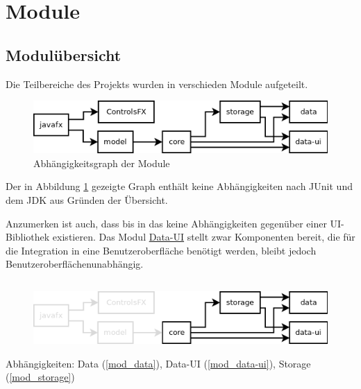 
\newcommand{\depBox}[1]{
	\begin{adjustbox}{minipage=0.85\textwidth,margin=0 \smallskipamount,center}
		Abhängigkeiten:	 \quad #1
	\end{adjustbox} ~\\
}

\section{Module}
\subsection{Modulübersicht}
Die Teilbereiche des Projekts wurden in verschieden Module aufgeteilt.

\begin{figure}[hb!]
	\centering
	\includegraphics[width=.8\textwidth]{module_dependencies.png}
	\caption{Abhängigkeitsgraph der Module}
	\label{mod_dep_view}
\end{figure}

Der in Abbildung \ref{mod_dep_view} gezeigte Graph enthält keine Abhängigkeiten nach JUnit und
dem JDK aus Gründen der Übersicht.

Anzumerken ist auch, dass bis in das  keine Abhängigkeiten
gegenüber einer UI-Bibliothek existieren. Das Modul \hyperref[mod_data-ui]{Data-UI} stellt
zwar Komponenten bereit, die für die Integration in eine Benutzeroberfläche benötigt werden,
bleibt jedoch Benutzeroberflächenunabhängig.


\subsection{\textModCore}
\label{\textModCore}
\begin{figure}[hb!]
	\centering
	\includegraphics[width=.8\textwidth]{module_dependencies_core.png}
\end{figure}
\depBox{Data (\ref{mod_data}), Data-UI (\ref{mod_data-ui}), Storage (\ref{mod_storage})}

